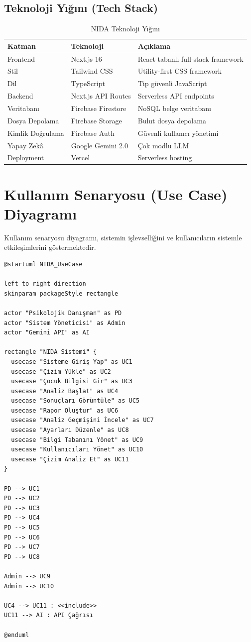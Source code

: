 \subsection{Teknoloji Yığını (Tech Stack)}

\begin{table}[H]
\centering
\caption{NIDA Teknoloji Yığını}
\label{tab:techstack}
\begin{tabular}{p{3cm}p{4cm}p{6cm}}
\toprule
\textbf{Katman} & \textbf{Teknoloji} & \textbf{Açıklama} \\
\midrule
Frontend & Next.js 16 & React tabanlı full-stack framework \\
Stil & Tailwind CSS & Utility-first CSS framework \\
Dil & TypeScript & Tip güvenli JavaScript \\
Backend & Next.js API Routes & Serverless API endpoints \\
Veritabanı & Firebase Firestore & NoSQL belge veritabanı \\
Dosya Depolama & Firebase Storage & Bulut dosya depolama \\
Kimlik Doğrulama & Firebase Auth & Güvenli kullanıcı yönetimi \\
Yapay Zekâ & Google Gemini 2.0 & Çok modlu LLM \\
Deployment & Vercel & Serverless hosting \\
\bottomrule
\end{tabular}
\end{table}

\section{Kullanım Senaryosu (Use Case) Diyagramı}

Kullanım senaryosu diyagramı, sistemin işlevselliğini ve kullanıcıların sistemle etkileşimlerini göstermektedir.

\begin{tcolorbox}[colback=gray!5, colframe=gray!75, title=Use Case Diyagramı (PlantUML)]
\begin{verbatim}
@startuml NIDA_UseCase

left to right direction
skinparam packageStyle rectangle

actor "Psikolojik Danışman" as PD
actor "Sistem Yöneticisi" as Admin
actor "Gemini API" as AI

rectangle "NIDA Sistemi" {
  usecase "Sisteme Giriş Yap" as UC1
  usecase "Çizim Yükle" as UC2
  usecase "Çocuk Bilgisi Gir" as UC3
  usecase "Analiz Başlat" as UC4
  usecase "Sonuçları Görüntüle" as UC5
  usecase "Rapor Oluştur" as UC6
  usecase "Analiz Geçmişini İncele" as UC7
  usecase "Ayarları Düzenle" as UC8
  usecase "Bilgi Tabanını Yönet" as UC9
  usecase "Kullanıcıları Yönet" as UC10
  usecase "Çizim Analiz Et" as UC11
}

PD --> UC1
PD --> UC2
PD --> UC3
PD --> UC4
PD --> UC5
PD --> UC6
PD --> UC7
PD --> UC8

Admin --> UC9
Admin --> UC10

UC4 --> UC11 : <<include>>
UC11 --> AI : API Çağrısı

@enduml
\end{verbatim}
\end{tcolorbox}

